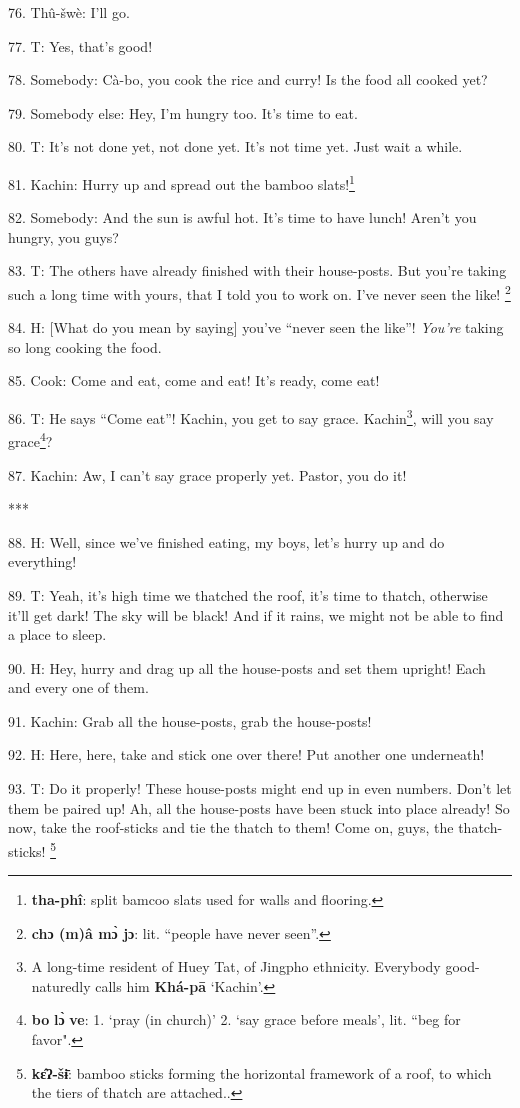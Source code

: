 76. Thû-šwè: I'll go.

77. T: Yes, that's good!

78. Somebody: Cà-bo, you cook the rice and curry! Is the food all cooked yet?

79. Somebody else: Hey, I'm hungry too. It's time to eat.

80. T: It's not done yet, not done yet. It's not time yet. Just wait a while.

81. Kachin: Hurry up and spread out the bamboo slats!\footnote{\textbf{tha-phî}: split bamcoo slats used for walls and flooring.}

82. Somebody: And the sun is awful hot. It's time to have lunch! Aren't you hungry,
you guys?

83. T: The others have already finished with their house-posts. But you're taking
such a long time with yours, that I told you to work on. I've never seen the like!
\footnote{\textbf{chɔ (m)â mɔ̀ jɔ}: lit. ``people have never seen''.}

84. H: [What do you mean by saying] you've ``never seen the like''!
\textit{You're} taking so long cooking the food.

85. Cook: Come and eat, come and eat! It's ready, come eat!

86. T: He says ``Come eat''! Kachin, you get to say grace. Kachin\footnote{A long-time resident of Huey Tat, of Jingpho ethnicity. Everybody good-naturedly calls him \textbf{Khá-pā} `Kachin'.}, will
you say grace\footnote{\textbf{bo} \textbf{lɔ̀} \textbf{ve}: 1. `pray (in church)' 2. `say grace before meals', lit. ``beg for favor".}?

87. Kachin: Aw, I can't say grace properly yet. Pastor, you do it!

***

88. H: Well, since we've finished eating, my boys, let's hurry up and do everything!

89. T: Yeah, it's high time we thatched the roof, it's time to thatch, otherwise
it'll get dark! The sky will be black! And if it rains, we might not be able
to find a place to sleep.

90. H: Hey, hurry and drag up all the house-posts and set them upright! Each and
every one of them.

91. Kachin: Grab all the house-posts, grab the house-posts!

92. H: Here, here, take and stick one over there! Put another one underneath!

93. T: Do it properly! These house-posts might end up in even numbers. Don't
let them be paired up! Ah, all the house-posts have been stuck into place already!
So now, take the roof-sticks and tie the thatch to them! Come on, guys, the thatch-sticks!
\footnote{\textbf{kɛ̂ʔ-šɨ̄}: bamboo sticks forming the horizontal framework of a roof, to which the tiers of thatch are attached..}

